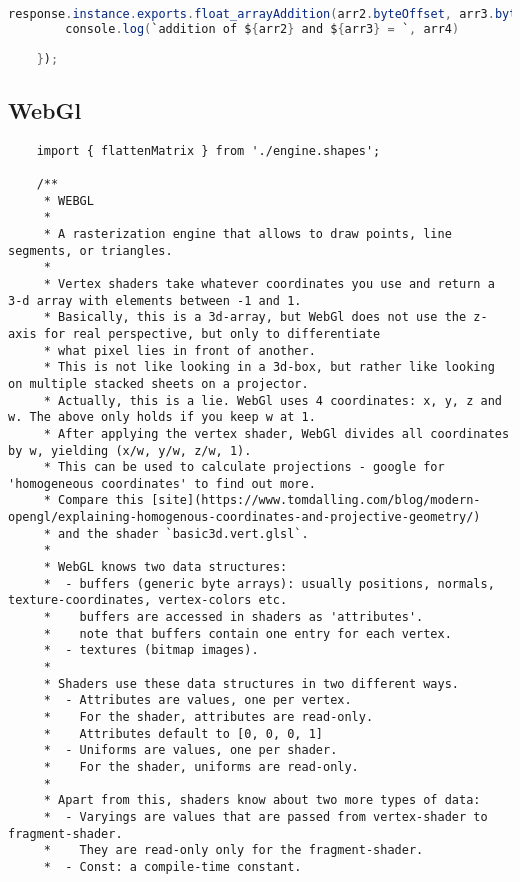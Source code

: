 {\begin{lstlisting}[language=java]
        response.instance.exports.float_arrayAddition(arr2.byteOffset, arr3.byteOffset, arr4.byteOffset, l);
        console.log(`addition of ${arr2} and ${arr3} = `, arr4)
        
    });
\end{lstlisting}


\subsection{WebGl}

\begin{lstlisting}
    import { flattenMatrix } from './engine.shapes';

    /**
     * WEBGL
     *
     * A rasterization engine that allows to draw points, line segments, or triangles.
     *
     * Vertex shaders take whatever coordinates you use and return a 3-d array with elements between -1 and 1.
     * Basically, this is a 3d-array, but WebGl does not use the z-axis for real perspective, but only to differentiate
     * what pixel lies in front of another.
     * This is not like looking in a 3d-box, but rather like looking on multiple stacked sheets on a projector.
     * Actually, this is a lie. WebGl uses 4 coordinates: x, y, z and w. The above only holds if you keep w at 1.
     * After applying the vertex shader, WebGl divides all coordinates by w, yielding (x/w, y/w, z/w, 1).
     * This can be used to calculate projections - google for 'homogeneous coordinates' to find out more.
     * Compare this [site](https://www.tomdalling.com/blog/modern-opengl/explaining-homogenous-coordinates-and-projective-geometry/)
     * and the shader `basic3d.vert.glsl`.
     *
     * WebGL knows two data structures:
     *  - buffers (generic byte arrays): usually positions, normals, texture-coordinates, vertex-colors etc.
     *    buffers are accessed in shaders as 'attributes'.
     *    note that buffers contain one entry for each vertex.
     *  - textures (bitmap images).
     *
     * Shaders use these data structures in two different ways.
     *  - Attributes are values, one per vertex.
     *    For the shader, attributes are read-only.
     *    Attributes default to [0, 0, 0, 1]
     *  - Uniforms are values, one per shader.
     *    For the shader, uniforms are read-only.
     *
     * Apart from this, shaders know about two more types of data:
     *  - Varyings are values that are passed from vertex-shader to fragment-shader.
     *    They are read-only only for the fragment-shader.
     *  - Const: a compile-time constant.

\end{lstlisting}}
